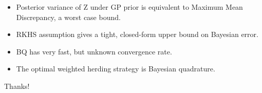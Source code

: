 \documentclass[usenames,dvipsnames]{beamer}
\begin{document}
\begin{frame}[plain, t]
	\titlebodyskip
	\headerbar
	{
	}
	\bodyheaderskip
	\slidebody
	{
			\begin{itemize}
				\item Posterior variance of Z under GP prior is equivalent to Maximum Mean Discrepancy, a worst case bound.
				\pause
				\item RKHS assumption gives a tight, closed-form upper bound on Bayesian error.
				\pause
				\item BQ has very fast, but unknown convergence rate.
				\pause
				\item The optimal weighted herding strategy is Bayesian quadrature.
			\end{itemize}					
	}
	\takeaway%
{
	Thanks!
}
\end{frame}



\end{document}
